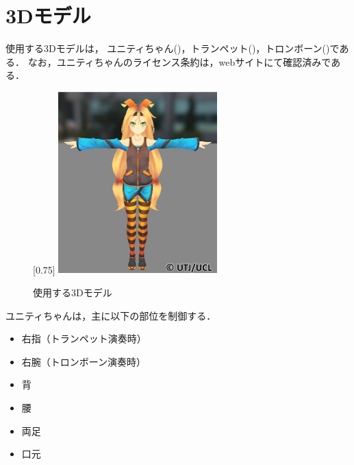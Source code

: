 \section{3Dモデル} \label{sec:3Dmodel}
使用する3Dモデルは，
ユニティちゃん(\cite{unity})，トランペット(\cite{tp})，トロンボーン(\cite{tb})である．
なお，ユニティちゃんのライセンス条約は，webサイト\cite{license}にて確認済みである．
\begin{figure}[h]
	\centering
	[0.75\linewidth]{
		\includegraphics[height=7cm]{fig/chap3/unity.eps}}
	\caption{使用する3Dモデル}
	\label{fig:model}
\end{figure}
\newpage
\indent
ユニティちゃんは，主に以下の部位を制御する．
\begin{itemize}
	\item 右指（トランペット演奏時）
	\item 右腕（トロンボーン演奏時）
	\item 背
	\item 腰
	\item 両足
	\item 口元
\end{itemize}
